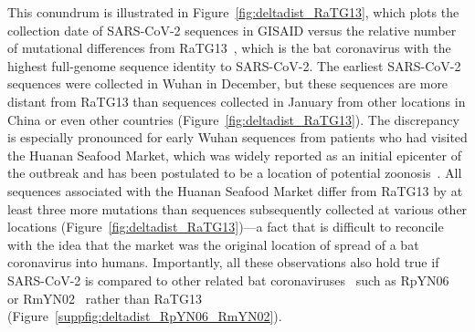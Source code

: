 \documentclass[9pt,twocolumn,twoside]{gsajnl_modified}
\begin{document}
This conundrum is illustrated in Figure~\ref{fig:deltadist_RaTG13}, which plots the collection date of SARS-CoV-2 sequences in GISAID versus the relative number of mutational differences from RaTG13~\citep{zhou2020pneumonia}, which is the bat coronavirus with the highest full-genome sequence identity to SARS-CoV-2.
The earliest SARS-CoV-2 sequences were collected in Wuhan in December, but these sequences are more distant from RaTG13 than sequences collected in January from other locations in China or even other countries (Figure~\ref{fig:deltadist_RaTG13}).
The discrepancy is especially pronounced for early Wuhan sequences from patients who had visited the Huanan Seafood Market, which was widely reported as an initial epicenter of the outbreak and has been postulated to be a location of potential zoonosis~\citep{WHO2021origins}.
All sequences associated with the Huanan Seafood Market differ from RaTG13 by at least three more mutations than sequences subsequently collected at various other locations (Figure~\ref{fig:deltadist_RaTG13})---a fact that is difficult to reconcile with the idea that the market was the original location of spread of a bat coronavirus into humans.
Importantly, all these observations also hold true if SARS-CoV-2 is compared to other related bat coronaviruses~\citep{lytras2021exploring} such as RpYN06~\citep{zhou2021identification} or RmYN02~\citep{zhou2020novel} rather than RaTG13 (Figure~\ref{suppfig:deltadist_RpYN06_RmYN02}).
\end{document}
